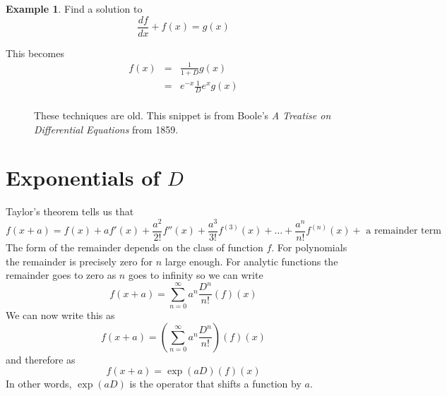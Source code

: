 \documentclass[a4paper]{article}
\theoremstyle{definition}
\newtheorem{example}{Example}[section]
\begin{document}
\begin{example}
Find a solution to
\[
\frac{df}{dx}+f(x) = g(x)
\]
\end{example}
This becomes
\begin{eqnarray*}
f(x) & = & \frac{1}{1+D}g(x) \\
& = & e^{-x}\frac{1}{D}e^x g(x) \\
\end{eqnarray*}


\begin{figure}
\centering
{}
\caption{These techniques are old. This snippet is from Boole's \emph{A Treatise on Differential Equations} from 1859.}
\end{figure}

\section{Exponentials of $D$}
Taylor's theorem tells us that
\[
f(x+a) = f(x)+af'(x)+\frac{a^2}{2!}f''(x)+\frac{a^3}{3!}f^{(3)}(x)+\ldots+\frac{a^n}{n!}f^{(n)}(x)+\mbox{ a remainder term}
\]
The form of the remainder depends on the class of function $f$.
For polynomials the remainder is precisely zero for $n$ large enough.
For analytic functions the remainder goes to zero as $n$ goes to infinity so we can write
\[
f(x+a) = \sum_{n=0}^\infty a^n\frac{D^n}{n!}(f)(x)
\]
We can now write this as
\[
f(x+a) = (\sum_{n=0}^\infty a^n\frac{D^n}{n!})(f)(x)
\]
and therefore as
\[
f(x+a) = \exp(aD)(f)(x)
\]
In other words, $\exp(aD)$ is the operator that shifts a function by $a$.
\end{document}
